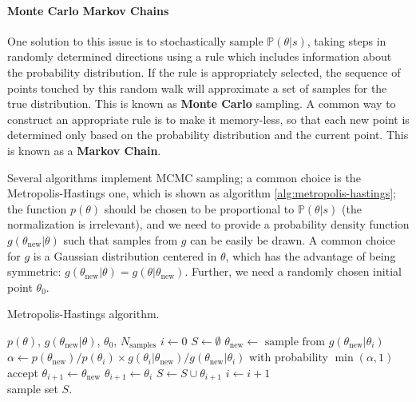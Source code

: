 \documentclass[main.tex]{subfiles}
\begin{document}
\paragraph{Monte Carlo Markov Chains}

One solution to this issue is to stochastically sample \(\mathbb{P}(\theta | s)\), taking steps in randomly determined directions using a rule which includes information about the probability distribution. 
If the rule is appropriately selected, the sequence of points touched by this random walk will approximate a set of samples for the true distribution. This is known as \textbf{Monte Carlo} sampling. 
A common way to construct an appropriate rule is to make it memory-less, so that each new point is determined only based on the probability distribution and the current point. This is known as a \textbf{Markov Chain}. 

Several algorithms implement \ac{MCMC} sampling; a common choice is the Metropolis-Hastings one, which is shown as algorithm \ref{alg:metropolis-hastings}; the function \(p(\theta )\) should be chosen to be proportional to \(\mathbb{P}(\theta | s)\) (the normalization is irrelevant), and we need to provide a probability density function \(g(\theta _{\text{new}}  | \theta  )\) such that samples from \(g\) can be easily be drawn. A common choice for \(g\) is a Gaussian distribution centered in \(\theta \), which has the advantage of being symmetric: \(g( \theta _{\text{new}}| \theta ) = g (\theta | \theta _{\text{new}})\).
Further, we need a randomly chosen initial point \(\theta_0 \).

\begin{algorithm}
\caption{Metropolis-Hastings algorithm. }\label{alg:metropolis-hastings}
\begin{algorithmic}
\Require $p(\theta )$, \(g(\theta _{\text{new}} | \theta  )\), \(\theta_0 \), \(N _{\text{samples}}\)
\State $i \gets 0$
\State $S \gets \emptyset$ 
\State \(\theta _{\text{new}} \gets \text{ sample from } g(\theta _{\text{new}} | \theta_{i})\)
\State \(\alpha \gets p(\theta _{\text{new}}) / p(\theta_i) \times g(\theta _i | \theta _{\text{new}}) / g(\theta _{\text{new}} | \theta_i)\) 
\State with probability \(\min(\alpha, 1) \) accept
    \State $\theta_{i+1} \gets \theta  _{\text{new}}$
\Else
    \State $\theta _{i+1} \gets \theta _i$
\EndIf
\State \(S \gets S \cup \theta_{i+1}\)
\State \(i \gets i+1\)
\EndWhile \\
\Return sample set \(S\). 
\end{algorithmic}
\end{algorithm}
\end{document}
